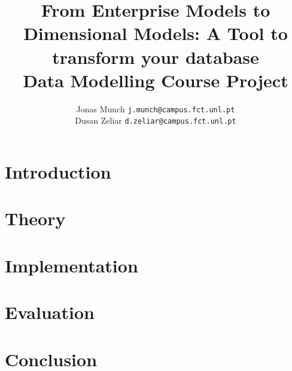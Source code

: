 \documentclass[a4paper, 10 pt, conference]{ieeeconf}
\title{\LARGE \bf
  From Enterprise Models to Dimensional Models: A Tool to transform your database \\
  Data Modelling Course Project
}
\author{
Jonas Munch {\tt\small j.munch@campus.fct.unl.pt} \\
Dusan Zeliar {\tt\small d.zeliar@campus.fct.unl.pt}
}
\begin{document}
\maketitle
\thispagestyle{empty}
\pagestyle{empty}



\begin{abstract}

\end{abstract}


\section{Introduction}
\label{sec:introduction}


\section{Theory}
\label{sec:theory}


\section{Implementation}
\label{sec:implementation}


\section{Evaluation}
\label{sec:evaluation}


\section{Conclusion}
\label{sec:conclusion}


%

\addtolength{\textheight}{0cm}   %
\end{document}
